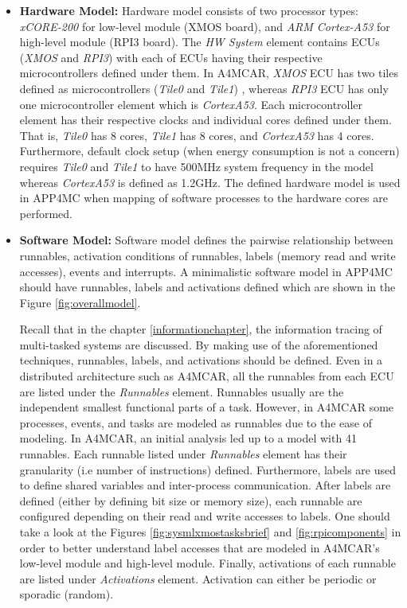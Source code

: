 \begin{itemize}
	\item \textbf{Hardware Model:} Hardware model consists of two processor types: \textit{xCORE-200} for low-level module (XMOS board), and \textit{ARM Cortex-A53} for high-level module (RPI3 board). The \textit{HW System} element contains ECUs (\textit{XMOS} and \textit{RPI3}) with each of ECUs having their respective microcontrollers defined under them. In A4MCAR, \textit{XMOS} ECU has two tiles defined as microcontrollers (\textit{Tile0} and \textit{Tile1}) , whereas \textit{RPI3} ECU has only one microcontroller element which is \textit{CortexA53}. Each microcontroller element has their respective clocks and individual cores defined under them. That is, \textit{Tile0} has 8 cores, \textit{Tile1} has 8 cores, and \textit{CortexA53} has 4 cores. Furthermore, default clock setup (when energy consumption is not a concern) requires \textit{Tile0} and \textit{Tile1} to have 500MHz system frequency in the model whereas \textit{CortexA53} is defined as 1.2GHz. The defined hardware model is used in APP4MC when mapping of software processes to the hardware cores are performed.
	\item \textbf{Software Model:} Software model defines the pairwise relationship between runnables, activation conditions of runnables, labels (memory read and write accesses), events and interrupts. A minimalistic software model in APP4MC should have runnables, labels and activations defined which are shown in the Figure \ref{fig:overallmodel}. 
	
	Recall that in the chapter \ref{informationchapter}, the information tracing of multi-tasked systems are discussed. By making use of the aforementioned techniques, runnables, labels, and activations should be defined. Even in a distributed architecture such as A4MCAR, all the runnables from each ECU are listed under the \textit{Runnables} element. Runnables usually are the independent smallest functional parts of a task. However, in A4MCAR some processes, events, and tasks are modeled as runnables due to the ease of modeling. In A4MCAR, an initial analysis led up to a model with 41 runnables. Each runnable listed under \textit{Runnables} element has their granularity (i.e number of instructions) defined. Furthermore, labels are used to define shared variables and inter-process communication. After labels are defined (either by defining bit size or memory size), each runnable are configured depending on their read and write accesses to labels. One should take a look at the Figures \ref{fig:sysmlxmostasksbrief} and \ref{fig:rpicomponents} in order to better understand label accesses that are modeled in A4MCAR's low-level module and high-level module. Finally, activations of each runnable are listed under \textit{Activations} element. Activation can either be periodic or sporadic (random).
	

\end{itemize}
